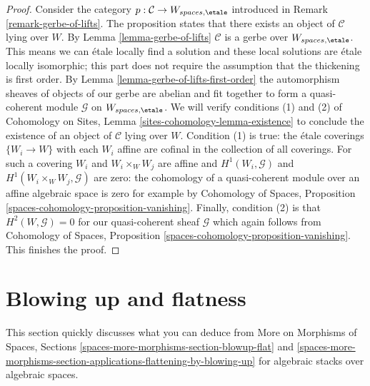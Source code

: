 \begin{proof}
Consider the category $p : \mathcal{C} \to W_{spaces, \etale}$
introduced in Remark \ref{remark-gerbe-of-lifts}.
The proposition states that there exists an object of $\mathcal{C}$
lying over $W$. By Lemma \ref{lemma-gerbe-of-lifts}
$\mathcal{C}$ is a gerbe over $W_{spaces, \etale}$.
This means we can \'etale locally find a solution and
these local solutions are \'etale locally isomorphic;
this part does not require the assumption that the thickening is first order.
By Lemma \ref{lemma-gerbe-of-lifts-first-order}
the automorphism sheaves of objects of our gerbe are abelian and
fit together to form a quasi-coherent module $\mathcal{G}$
on $W_{spaces, \etale}$. We will verify conditions (1) and (2)
of Cohomology on Sites, Lemma \ref{sites-cohomology-lemma-existence}
to conclude the existence of an object of $\mathcal{C}$ lying over $W$.
Condition (1) is true: the \'etale coverings $\{W_i \to W\}$
with each $W_i$ affine are cofinal in the collection of all coverings.
For such a covering $W_i$ and $W_i \times_W W_j$ are affine
and $H^1(W_i, \mathcal{G})$ and $H^1(W_i \times_W W_j, \mathcal{G})$
are zero: the cohomology of a quasi-coherent module over an affine
algebraic space is zero for example by Cohomology of Spaces, Proposition
\ref{spaces-cohomology-proposition-vanishing}.
Finally, condition (2) is that $H^2(W, \mathcal{G}) = 0$
for our quasi-coherent sheaf $\mathcal{G}$ which again follows
from Cohomology of Spaces, Proposition
\ref{spaces-cohomology-proposition-vanishing}.
This finishes the proof.
\end{proof}










\section{Blowing up and flatness}
\label{section-blowup-flat}

\noindent
This section quickly discusses what you can deduce from
More on Morphisms of Spaces, Sections
\ref{spaces-more-morphisms-section-blowup-flat} and
\ref{spaces-more-morphisms-section-applications-flattening-by-blowing-up}
for algebraic stacks over algebraic spaces.

